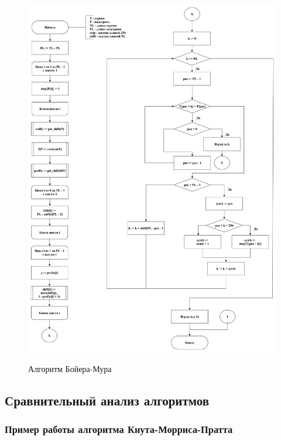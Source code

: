 \documentclass[a4paper,12pt]{article}
\begin{document}
\pagebreak

\begin{figure}[h!]
	\begin{center}
		{\includegraphics[scale = 0.35]{bm.pdf}}
		\caption{
			Алгоритм Бойера-Мура}
		\label{fig:bm}
	\end{center}
\end{figure}

\pagebreak

\subsection{Сравнительный анализ алгоритмов}
\label{fig:cmp_section}

\subsubsection{Пример работы алгоритма Кнута-Морриса-Пратта}
\end{document}
